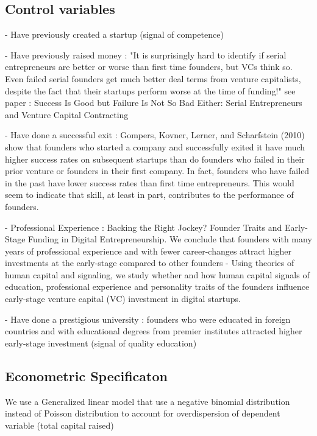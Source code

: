 \documentclass[12pt]{article}
\begin{document}
\subsection{Control variables}

- Have previously created a startup (signal of competence)

- Have previously raised money : "It is surprisingly hard to identify if serial entrepreneurs are better or worse than first time founders, but VCs think so. Even failed serial founders get much better deal terms from venture capitalists, despite the fact that their startups perform worse at the time of funding!" see paper : Success Is Good but Failure Is Not So Bad Either: Serial Entrepreneurs and Venture Capital Contracting

- Have done a successful exit : Gompers, Kovner, Lerner, and Scharfstein (2010) show that founders who started a company and successfully exited it have much higher success rates on subsequent startups than do founders who failed in their prior venture or founders in their first company. In fact, founders who have failed in the past have lower success rates than first time entrepreneurs. This would seem to indicate that skill, at least in part, contributes to the performance of founders.

- Professional Experience : Backing the Right Jockey? Founder Traits and Early-Stage Funding in Digital Entrepreneurship.
We conclude that founders with many years of professional experience and with fewer career-changes attract higher investments at the early-stage compared to other founders - Using theories of human capital and signaling, we study whether and how human capital signals of education, professional experience and personality traits of the founders influence early-stage venture capital (VC) investment in digital startups.

- Have done a prestigious university : founders who were educated in foreign countries and with educational degrees from premier institutes attracted higher early-stage investment (signal of quality education)

\subsection{Econometric Specificaton}

We use a Generalized linear model that use a negative binomial distribution instead of Poisson distribution to account for overdispersion of dependent variable (total capital raised)
\end{document}
